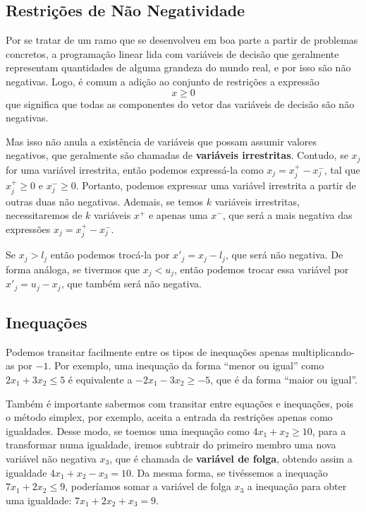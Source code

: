 \subsection{Restrições de Não Negatividade}
Por se tratar de um ramo que se desenvolveu em boa parte a partir de problemas concretos, a programação linear lida com variáveis de decisão que geralmente representam quantidades de alguma grandeza do mundo real, e por isso são não negativas. Logo, é comum a adição ao conjunto de restrições a expressão \[x \geq 0\]que significa que todas as componentes do vetor das variáveis de decisão são não negativas.

Mas isso não anula a existência de variáveis que possam assumir valores negativos, que geralmente são chamadas de \textbf{variáveis irrestritas}. Contudo, se $x_j$ for uma variável irrestrita, então podemos expressá-la como $x_j = x_j^+ - x_j^-$, tal que $x_j^+ \geq 0$ e $x_j^- \geq 0$. Portanto, podemos expressar uma variável irrestrita a partir de outras duas não negativas. Ademais, se temos $k$ variáveis irrestritas, necessitaremos de $k$ variáveis $x^+$ e apenas uma $x^-$, que será a mais negativa das expressões $x_j = x^+_j - x^-_j$. 

Se $x_j > l_j$ então podemos trocá-la por $x'_j = x_j - l_j$, que será não negativa. De forma análoga, se tivermos que $x_j < u_j$, então podemos trocar essa variável por $x'_j = u_j - x_j$, que também será não negativa.

\subsection{Inequações}

Podemos transitar facilmente entre os tipos de inequações apenas multiplicando-as por $-1$. Por exemplo, uma inequação da forma ``menor ou igual'' como $2x_1 + 3x_2 \leq 5$  é equivalente a $-2x_1 - 3x_2 \geq -5$, que é da forma ``maior ou igual''.

Também é importante sabermos com transitar entre equações e inequações, pois o método simplex, por exemplo, aceita a entrada da restrições apenas como igualdades. Desse modo, se toemos uma inequação como $4x_1 + x_2 \geq 10$, para a transformar numa igualdade, iremos subtrair do primeiro membro uma nova variável não negativa $x_3$, que é chamada de \textbf{variável de folga}, obtendo assim a igualdade $4x_1 + x_2 - x_3 = 10$. Da mesma forma, se tivéssemos a inequação $7x_1 + 2x_2 \leq 9$, poderíamos somar a variável de folga $x_3$ a inequação para obter uma igualdade: $7x_1 + 2x_2 + x_3 = 9$.

